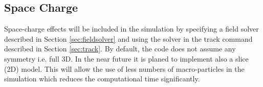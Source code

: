                                                                                 
%  
%                                                                                                                                                                                                                
%      


\subsection{Space Charge}
\label{sec:opalFlavours:spacecharge}
Space-charge effects will be included in the simulation by specifying a field solver described in Section \ref{sec:fieldsolver} and using the solver in the
track command described in Section \ref{sec:track}. 
By default, the code does not assume any symmetry i.e. full 3D. In the near future it is planed to implement also a slice (2D) model.
This will allow the use of less numbers of macro-particles in the simulation which reduces the computational time
significantly. 

